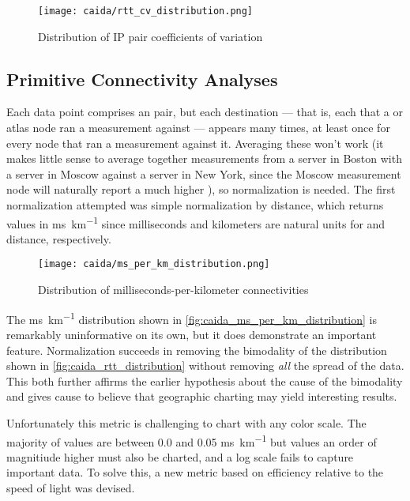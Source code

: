 \begin{figure}[H]
    \centering
    \texttt{[image: caida/rtt\_cv\_distribution.png]}
    \caption{Distribution of IP pair coefficients of variation}
    \label{fig:caida_cv_distribution}
\end{figure}

\subsection{Primitive Connectivity Analyses}

Each data point comprises an \ip pair, but each destination \ip --- that is, each \ip that a \caida or \ripe atlas node ran a measurement against --- appears many times, at least once for every node that ran a measurement against it. Averaging these won't work (it makes little sense to average together measurements from a server in Boston with a server in Moscow against a server in New York, since the Moscow measurement node will naturally report a much higher \rtt), so normalization is needed. The first normalization attempted was simple normalization by distance, which returns values in \si{\milli\second\per\kilo\meter} since milliseconds and kilometers are natural units for \rtts and distance, respectively.

\begin{figure}
    \centering
    \texttt{[image: caida/ms\_per\_km\_distribution.png]}
    \caption{Distribution of milliseconds-per-kilometer connectivities}
    \label{fig:caida_ms_per_km_distribution}
\end{figure}

The \si{\milli\second\per\kilo\meter} distribution shown in \autoref{fig:caida_ms_per_km_distribution} is remarkably uninformative on its own, but it does demonstrate an important feature. Normalization succeeds in removing the bimodality of the \rtt distribution shown in \autoref{fig:caida_rtt_distribution} without removing \textit{all} the spread of the data. This both further affirms the earlier hypothesis about the cause of the bimodality and gives cause to believe that geographic charting may yield interesting results.

Unfortunately this metric is challenging to chart with any color scale. The majority of values are between 0.0 and 0.05 \si{\milli\second\per\kilo\meter} but values an order of magnitiude higher must also be charted, and a log scale fails to capture important data. To solve this, a new metric based on efficiency relative to the speed of light was devised.

